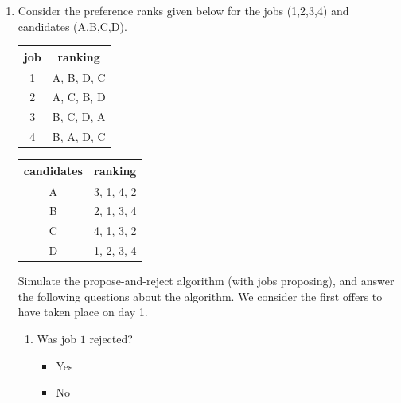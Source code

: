\documentclass[11pt, preview]{standalone} %
\begin{document}
\begin{enumerate}
\begin{Multi}
\begin{enumerate}
\end{enumerate}
\end{Multi}
 A matching is considered \emph{stable} if it contains no rogue couples. This is because no one can convince anyone else to leave their partner in order to form a new pair. The propose-and-reject algorithm allows us to find stable matchings. This algorithm is described in course note 4. The following problems are designed to give you practice with this algorithm.
\item Consider the preference ranks given below for the jobs (1,2,3,4) and candidates (A,B,C,D). 
\begin{center}
\begin{tabular}{|c|c|}
\hline
job & ranking \\
\hline
1 & A, B, D, C \\
\hline
2 & A, C, B, D\\
\hline
3 & B, C, D, A\\
\hline
4 & B, A, D, C\\
\hline
\end{tabular}
\qquad
\begin{tabular}{|c|c|}
\hline
candidates & ranking \\
\hline
A & 3, 1, 4, 2\\
\hline
B &  2, 1, 3, 4\\
\hline
C & 4, 1, 3, 2\\
\hline
D & 1, 2, 3, 4\\
\hline
\end{tabular}
\end{center}
Simulate the propose-and-reject algorithm (with jobs proposing), and answer the following questions about the algorithm. We consider the first offers to have taken place on day 1.
\begin{enumerate}
\item Was job $1$ rejected? %
\begin{Choices}
\begin{itemize}
\FalseChoice \item Yes
\TrueChoice \item No

\end{itemize}
\end{Choices}
\end{enumerate}
\end{enumerate}
\end{document}
